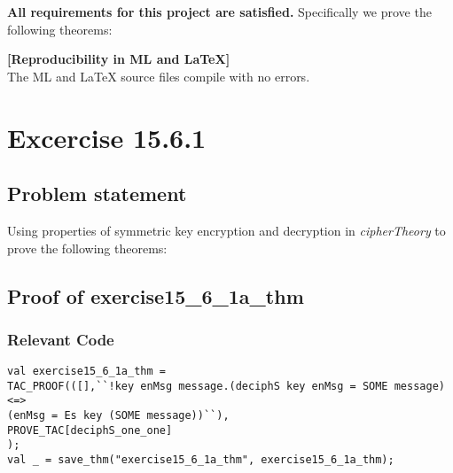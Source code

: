 \documentclass{report}
\begin{document}
\textbf{All requirements for this project are satisfied.}
Specifically we prove the following theorems:
\begin{quote}
\HOLcryptoExercisesTheoremsexerciseOneFiveXXSixXXOneaXXthm
{}\HOLcryptoExercisesTheoremsexerciseOneFiveXXSixXXOnebXXthm
{}\HOLcryptoExercisesTheoremsexerciseOneFiveXXSixXXTwoaXXthm
{}\HOLcryptoExercisesTheoremsexerciseOneFiveXXSixXXTwobXXthm
{}\HOLcryptoExercisesTheoremsexerciseOneFiveXXSixXXThreeXXthm
\end{quote}

\textbf{[Reproducibility in ML and \LaTeX{}]} \ \\
  The ML and \LaTeX{} source files compile with no errors.


\chapter{Excercise 15.6.1}
\label{cha:15.6.1}

\section{Problem statement}
\label{problem-statement-1}
Using properties of symmetric key encryption and decryption in \emph{cipherTheory} to prove the following theorems:
\begin{quote}
\HOLcryptoExercisesTheoremsexerciseOneFiveXXSixXXOneaXXthm
{}\HOLcryptoExercisesTheoremsexerciseOneFiveXXSixXXOnebXXthm
\end{quote}

\section{Proof of exercise15_6_1a_thm}
\label{proof-1}

\subsection{Relevant Code}
\label{rel-code-1}
\begin{lstlisting}[frame=TBlr]
val exercise15_6_1a_thm = 
TAC_PROOF(([],``!key enMsg message.(deciphS key enMsg = SOME message) <=>
(enMsg = Es key (SOME message))``),
PROVE_TAC[deciphS_one_one]
);
val _ = save_thm("exercise15_6_1a_thm", exercise15_6_1a_thm);

\end{lstlisting}
\end{document}
